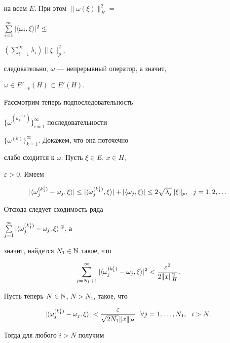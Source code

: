 на всем $E$. При этом $\|\omega(\xi)\|_H^2=$


$\sum\limits_{i=1}^{\infty}|\langle \omega_i,\xi\rangle |^2\leq$


$ (\sum\limits_{i=1}^{\infty}\lambda_i)\|\xi\|_p^2$,


следовательно, $\omega$ --- непрерывный оператор, а значит,


$\omega\in E'_{-p}(H)\subset E'(H)$.





Рассмотрим теперь подпоследовательность


$\{\omega^{(k_1^{(i)})}\}_{i=1}^{\infty}$ последовательности


$\{\omega^{(k)}\}_{k=1}^{\infty}$. Докажем, что она поточечно


слабо сходится к $\omega$. Пусть $\xi\in E$, $x\in H$,


$\varepsilon>0$. Имеем


$$


|\la \omega_j^{(k_1^i)}-\omega_j,\xi\ra |\leq


|\la \omega_j^{(k_1^i)},\xi\ra |+|\la \omega_j,\xi\ra |\leq


2\sqrt{\lambda_j}\|\xi\|_p, \ \ j=1,2,\dotsc


$$


Отсюда следует сходимость ряда


$\sum\limits_{j=1}^{\infty}|\langle \omega_j^{(k_1^i)}-\omega_j,\xi\rangle |^2$, а


значит, найдется $N_1\in\Bbb{N}$ такое, что


$$


\sum_{j=N_1+1}^{\infty}|\la \omega_j^{(k_1^i)}-\omega_j,\xi\ra |^2


<\frac{\varepsilon^2}{2\|x\|_H^2} .


$$


Пусть теперь $N\in\Bbb{N}$, $N>N_1$, такое, что


$$


|\la \omega_j^{(k_1^i)}-\omega_j,\xi\ra  |<


\frac{\varepsilon}{\sqrt{2N_1}\|x\|_H}


\ \ \forall j=1,\dotsc, N_1,\ \ i>N.


$$


Тогда для любого $i>N$ получим


